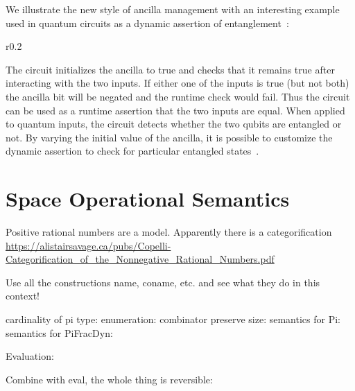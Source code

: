 \documentclass[sigplan,10pt,review,anonymous]{acmart}
\begin{document}
\PIFDUdef{}

\vspace{-\baselineskip}

\PIFDCombdef{}

\vspace{-\baselineskip}

\PIFDinterp{}

We illustrate the new style of ancilla management with an interesting
example used in quantum circuits as a dynamic assertion of
entanglement~\cite{DBLP:journals/cal/ZhouB19}:

\begin{wrapfigure}[0]{r}{0.2\textwidth}
  
\end{wrapfigure}  
\PIFDparity{}

\noindent The circuit initializes the ancilla to \textsf{true} and
checks that it remains \textsf{true} after interacting with the two
inputs. If either one of the inputs is \textsf{true} (but not both)
the ancilla bit will be negated and the runtime check would fail. Thus
the circuit can be used as a runtime assertion that the two inputs are
equal. When applied to quantum inputs, the circuit detects whether the
two qubits are entangled or not. By varying the initial value of the
ancilla, it is possible to customize the dynamic assertion to check
for particular entangled states~\cite{DBLP:journals/cal/ZhouB19}.

\section{Space Operational Semantics}
\label{sec:space}  

Positive rational numbers are a model. Apparently there is a
categorification
\url{https://alistairsavage.ca/pubs/Copelli-Categorification_of_the_Nonnegative_Rational_Numbers.pdf}

Use all the constructions name, coname, etc. and see what they do in this context!

cardinality of pi type:
\PIMEMcard{}
enumeration:
\PIMEMenum{}
combinator preserve size:
\PIMEMcardeq{}
semantics for Pi:
\PIMEMstate{}
\PIMEMstep{}
semantics for PiFracDyn:
\PIFMEMstate{}
\PIFMEMstep{}

Evaluation:
\PIPFeval{}

Combine with eval, the whole thing is reversible:
\PIPFrev{}

\end{document}
